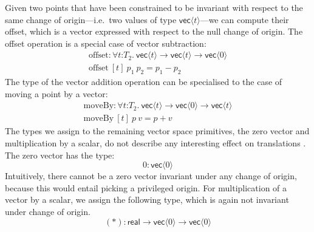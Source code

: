Given two points that have been constrained to be invariant with
respect to the same change of origin---i.e.~two values of type
$\mathsf{vec}\langle t \rangle$---we can compute their offset, which
is a vector expressed with respect to the null change of origin. The
offset operation is a special case of vector subtraction:
\begin{displaymath}
  \begin{array}{l}
    \mathrm{offset} : \forall t \mathord:T_2.\ \mathsf{vec}\langle t \rangle \to \mathsf{vec}\langle t \rangle \to \mathsf{vec}\langle 0 \rangle \\
    \mathrm{offset}\ [t]\ p_1\ p_2 = p_1 - p_2
  \end{array}
\end{displaymath}
The type of the vector addition operation can be specialised to the
case of moving a point by a vector:
\begin{displaymath}
  \begin{array}{l}
    \mathrm{moveBy} : \forall t \mathord:T_2.\ \mathsf{vec}\langle t \rangle \to \mathsf{vec}\langle 0 \rangle \to \mathsf{vec}\langle t \rangle \\
    \mathrm{moveBy}\ [t]\ p\ v = p + v
  \end{array}
\end{displaymath}
The types we assign to the remaining vector space primitives, the zero
vector and multiplication by a scalar, do not describe any interesting
effect on translations%
. The zero vector has the type:
\begin{displaymath}
  \mathrm{0} : \mathsf{vec}\langle 0 \rangle
\end{displaymath}
Intuitively, there cannot be a zero vector invariant under any change
of origin, because this would entail picking a privileged origin. For
multiplication of a vector by a scalar, we assign the following type,
which is again not invariant under change of origin.
\begin{displaymath}
  (*) : \mathsf{real} \to \mathsf{vec}\langle 0 \rangle \to \mathsf{vec}\langle 0 \rangle
\end{displaymath}

